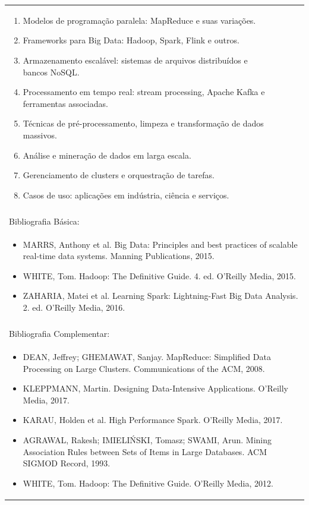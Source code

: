 \documentclass[11pt]{article}
\begin{document}
\begin{center}
\begin{longtable}{|p{4cm}|p{4cm}|p{4cm}|p{4cm}|}
{\begin{enumerate}
\item Modelos de programação paralela: MapReduce e suas variações.
\item Frameworks para Big Data: Hadoop, Spark, Flink e outros.
\item Armazenamento escalável: sistemas de arquivos distribuídos e bancos NoSQL.
\item Processamento em tempo real: stream processing, Apache Kafka e ferramentas associadas.
\item Técnicas de pré-processamento, limpeza e transformação de dados massivos.
\item Análise e mineração de dados em larga escala.
\item Gerenciamento de clusters e orquestração de tarefas.
\item Casos de uso: aplicações em indústria, ciência e serviços.\end{enumerate}}\\
\multicolumn{4}{|p{16cm}|}{}\\
\hline
\multicolumn{4}{|p{16cm}|}{Bibliografia Básica:}\\
\multicolumn{4}{|p{\dimexpr 16cm + 6\tabcolsep\relax}|}{%
\begin{itemize}\item MARRS, Anthony et al. Big Data: Principles and best practices of scalable real-time data systems. Manning Publications, 2015.
\item WHITE, Tom. Hadoop: The Definitive Guide. 4. ed. O'Reilly Media, 2015.
\item ZAHARIA, Matei et al. Learning Spark: Lightning-Fast Big Data Analysis. 2. ed. O'Reilly Media, 2016.\end{itemize}}\\
\multicolumn{4}{|p{16cm}|}{}\\
\hline
\multicolumn{4}{|p{16cm}|}{Bibliografia Complementar:}\\
\multicolumn{4}{|p{\dimexpr 16cm + 6\tabcolsep\relax}|}{%
\begin{itemize}\item DEAN, Jeffrey; GHEMAWAT, Sanjay. MapReduce: Simplified Data Processing on Large Clusters. Communications of the ACM, 2008.
\item KLEPPMANN, Martin. Designing Data-Intensive Applications. O'Reilly Media, 2017.
\item KARAU, Holden et al. High Performance Spark. O'Reilly Media, 2017.
\item AGRAWAL, Rakesh; IMIELIŃSKI, Tomasz; SWAMI, Arun. Mining Association Rules between Sets of Items in Large Databases. ACM SIGMOD Record, 1993.
\item WHITE, Tom. Hadoop: The Definitive Guide. O'Reilly Media, 2012.\end{itemize}}\\
\hline
\end{longtable}
\end{center}
\end{document}
